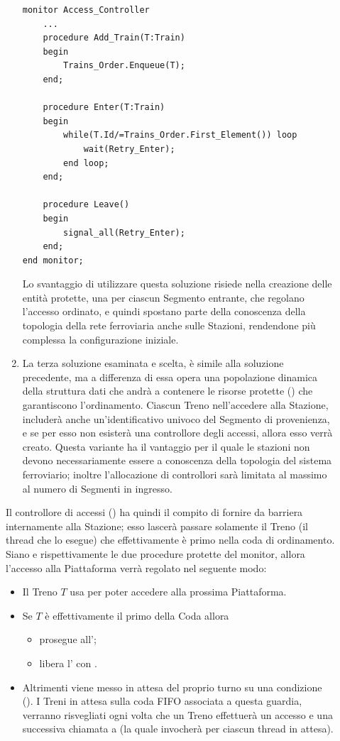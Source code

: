 \begin{description}
\begin{enumerate}
\begin{lstlisting}[label=station_access_controller]	
monitor Access_Controller
	...
	procedure Add_Train(T:Train)
	begin
		Trains_Order.Enqueue(T);
	end;

	procedure Enter(T:Train) 
	begin
		while(T.Id/=Trains_Order.First_Element()) loop
			wait(Retry_Enter);
		end loop;
	end;

	procedure Leave()
	begin
		signal_all(Retry_Enter);
	end;
end monitor;

\end{lstlisting}
			
			Lo svantaggio di utilizzare questa soluzione risiede nella creazione delle entità protette, una per ciascun Segmento entrante, che regolano l'accesso ordinato, e quindi spostano parte della conoscenza della topologia della rete ferroviaria anche sulle Stazioni, rendendone più complessa la configurazione iniziale.
			
			\item La terza soluzione esaminata e scelta, è simile alla soluzione precedente, ma a differenza di essa opera una popolazione dinamica della struttura dati che andrà a contenere le risorse protette () che garantiscono l'ordinamento. Ciascun Treno nell'accedere alla Stazione, includerà anche un'identificativo univoco del Segmento di provenienza, e se per esso non esisterà una controllore degli accessi, allora esso verrà creato. Questa variante ha il vantaggio per il quale le stazioni non devono necessariamente essere a conoscenza della topologia del sistema ferroviario; inoltre l'allocazione di controllori sarà limitata al massimo al numero di Segmenti in ingresso.
		\end{enumerate} 
		
		Il controllore di accessi () ha quindi il compito di fornire da barriera internamente alla Stazione; esso lascerà passare solamente il Treno (il thread che lo esegue) che effettivamente è primo nella coda di ordinamento. Siano  e  rispettivamente le due procedure protette del monitor, allora l'accesso alla Piattaforma verrà regolato nel seguente modo:
			\begin{itemize}
				\item Il Treno $T$ usa  per poter accedere alla prossima Piattaforma.
				\item Se $T$ è effettivamente il primo della Coda allora 
					\begin{itemize}
						\item prosegue all';
						\item libera l' con . 
					\end {itemize}
				\item Altrimenti viene messo in attesa del proprio turno su una condizione (). I Treni in attesa sulla coda FIFO associata a questa guardia, verranno risvegliati ogni volta che un Treno effettuerà un accesso e una successiva chiamata a  (la quale invocherà  per ciascun thread in attesa).
			\end{itemize}
		

\end{description}
